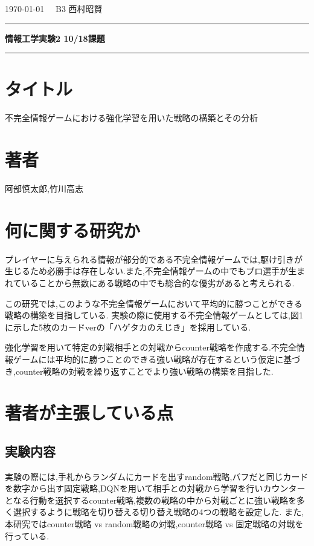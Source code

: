 \documentclass{jarticle}     %
\begin{document}
  \onecolumn
  \noindent
  \hspace{1em}

  \today
  \hfill
  \ \  B3 西村昭賢 

  \vspace{2mm}
  \hrule
  \begin{center}
  {\Large \bf 情報工学実験2 10/18課題}
  \end{center}
  \hrule
  \vspace{3mm}


\section*{タイトル}
不完全情報ゲームにおける強化学習を用いた戦略の構築とその分析

\section*{著者}
阿部慎太郎,竹川高志

\section*{何に関する研究か}
プレイヤーに与えられる情報が部分的である不完全情報ゲームでは,駆け引きが生じるため必勝手は存在しない.また,不完全情報ゲームの中でもプロ選手が生まれていることから無数にある戦略の中でも総合的な優劣があると考えられる.\par
この研究では,このような不完全情報ゲームにおいて平均的に勝つことができる戦略の構築を目指している.
実験の際に使用する不完全情報ゲームとしては,図1に示した5枚のカードverの「ハゲタカのえじき」を採用している.\par
強化学習を用いて特定の対戦相手との対戦からcounter戦略を作成する.不完全情報ゲームには平均的に勝つことのできる強い戦略が存在するという仮定に基づき,counter戦略の対戦を繰り返すことでより強い戦略の構築を目指した.\par


\section*{著者が主張している点}

\subsection*{実験内容}
実験の際には,手札からランダムにカードを出すrandom戦略,バフだと同じカードを数字から出す固定戦略,DQNを用いて相手との対戦から学習を行いカウンターとなる行動を選択するcounter戦略,複数の戦略の中から対戦ごとに強い戦略を多く選択するように戦略を切り替える切り替え戦略の4つの戦略を設定した.
また,本研究ではcounter戦略 vs random戦略の対戦,counter戦略 vs 固定戦略の対戦を行っている.\par
\end{document}
